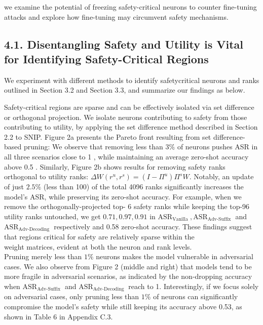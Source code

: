 \documentclass[10pt]{article}
\begin{document}
we examine the potential of freezing safety-critical neurons to counter fine-tuning attacks and explore how fine-tuning may circumvent safety mechanisms.

\subsection*{4.1. Disentangling Safety and Utility is Vital for Identifying Safety-Critical Regions}
We experiment with different methods to identify safetycritical neurons and ranks outlined in Section 3.2 and Section 3.3, and summarize our findings as below.

Safety-critical regions are sparse and can be effectively isolated via set difference or orthogonal projection. We isolate neurons contributing to safety from those contributing to utility, by applying the set difference method described in Section 2.2 to SNIP. Figure 2a presents the Pareto front resulting from set difference-based pruning: We observe that removing less than $3 \%$ of neurons pushes ASR in all three scenarios close to 1 , while maintaining an average zero-shot accuracy above 0.5 . Similarly, Figure 2b shows results for removing safety ranks orthogonal to utility ranks: $\Delta W\left(r^{u}, r^{s}\right)=\left(I-\Pi^{u}\right) \Pi^{s} W$. Notably, an update of just $2.5 \%$ (less than 100) of the total 4096 ranks significantly increases the model's ASR, while preserving its zero-shot accuracy. For example, when we remove the orthogonally-projected top- 6 safety ranks while keeping the top-96 utility ranks untouched, we get $0.71,0.97,0.91$ in $\mathrm{ASR}_{\text {Vanilla }}, \mathrm{ASR}_{\text {Adv-Suffix }}$ and $\mathrm{ASR}_{\text {Adv-Decoding }}$ respectively and 0.58 zero-shot accuracy. These findings suggest that regions critical for safety are relatively sparse within the\\
weight matrices, evident at both the neuron and rank levels.\\
Pruning merely less than $1 \%$ neurons makes the model vulnerable in adversarial cases. We also observe from Figure 2 (middle and right) that models tend to be more fragile in adversarial scenarios, as indicated by the non-dropping accuracy when $\mathrm{ASR}_{\text {Adv-Suffix }}$ and $\mathrm{ASR}_{\text {Adv-Decoding }}$ reach to 1. Interestingly, if we focus solely on adversarial cases, only pruning less than $1 \%$ of neurons can significantly compromise the model's safety while still keeping its accuracy above 0.53, as shown in Table 6 in Appendix C.3.
\end{document}
